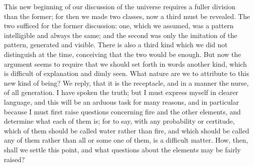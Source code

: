 This new beginning of our discussion of the universe requires a fuller
division than the former; for then we made two classes, now a third must
be revealed. The two sufficed for the former discussion: one, which we
assumed, was a pattern intelligible and always the same; and the second
was only the imitation of the pattern, generated and visible. There is
also a third kind which we did not distinguish at the time, conceiving
that the two would be enough. But now the argument seems to require that
we should set forth in words another kind, which is difficult of
explanation and dimly seen. What nature are we to attribute to this new
kind of being? We reply, that it is the receptacle, and in a manner the
nurse, of all generation. I have spoken the truth; but I must express
myself in clearer language, and this will be an arduous task for many
reasons, and in particular because I must first raise questions concerning
fire and the other elements, and determine what each of them is; for to
say, with any probability or certitude, which of them should be called
water rather than fire, and which should be called any of them rather than
all or some one of them, is a difficult matter. How, then, shall we settle
this point, and what questions about the elements may be fairly raised?

